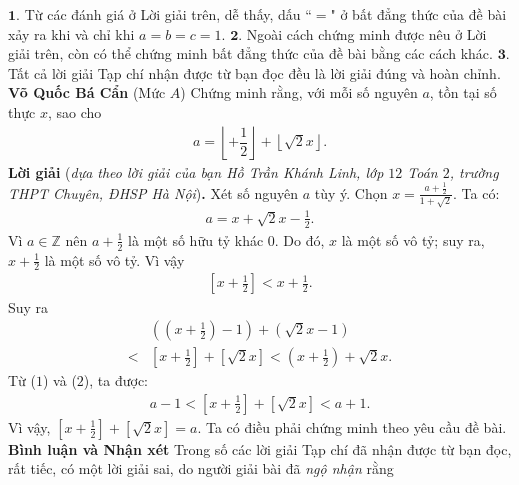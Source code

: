 \begin{multicols}{2}
	\vskip 0.05cm
	$\pmb{1.}$ Từ các đánh giá ở Lời giải trên, dễ thấy, dấu ``$=$" ở bất đẳng thức của đề bài xảy ra khi và chỉ khi $a = b = c = 1$.
	\vskip 0.05cm
	$\pmb{2.}$ Ngoài cách chứng minh được nêu ở Lời giải trên, còn có thể chứng minh bất đẳng thức của đề bài bằng các cách khác.
	\vskip 0.05cm
	$\pmb{3.}$ Tất cả lời giải Tạp chí nhận được từ bạn đọc đều là lời giải đúng và hoàn chỉnh.
	\vskip 0.15cm
	\hfill	\textbf{\color{thachthuctoanhoc}Võ Quốc Bá Cẩn}
	\vskip 0.15cm
	{}
	(Mức $A$) Chứng minh rằng, với mỗi số nguyên $a$, tồn tại số thực $x$, sao cho  
	\begin{align*}
		a=\left\lfloor +\dfrac12\right\rfloor+\left\lfloor\sqrt{2}x\right\rfloor.
	\end{align*}
	\textbf{\color{thachthuctoanhoc}Lời giải} (\textit{dựa theo lời giải của bạn Hồ Trần Khánh Linh, lớp $12$ Toán $2$, trường THPT Chuyên, ĐHSP Hà Nội})\textbf{\color{thachthuctoanhoc}.}
	\vskip 0.05cm
	Xét số nguyên $a$ tùy ý. Chọn $x = \frac{{a + \frac{1}{2}}}{{1 + \sqrt 2 }}.$  Ta có:
	\begin{align*}
		a = x + \sqrt 2 x - \frac{1}{2}. \tag{$1$}
	\end{align*}
	Vì $a \in \mathbb{Z}$  nên $a + \frac{1}{2}$ là một số hữu tỷ khác $0$. Do đó, $x$ là một số vô tỷ; suy ra, $x + \frac{1}{2}$ là một số vô tỷ. Vì vậy
	\begin{align*}
		\left[ {x + \frac{1}{2}} \right] < x + \frac{1}{2}.
	\end{align*}
	Suy ra
	\begin{align*}
		&\left( {\left( {x + \frac{1}{2}} \right) - 1} \right) + \left( {\sqrt 2 x - 1} \right) \\
		< &\left[ {x \!+\! \frac{1}{2}} \right] \!+\! \left[ {\sqrt 2 x} \right] \!<\! \left( {x \!+\! \frac{1}{2}} \right) \!+\! \sqrt 2 x. \tag{$2$}
	\end{align*}
	Từ ($1$) và ($2$), ta được:
	\begin{align*}
		a - 1 < \left[ {x + \frac{1}{2}} \right] + \left[ {\sqrt 2 x} \right] < a + 1.
	\end{align*}
	Vì vậy, $\left[ {x + \frac{1}{2}} \right] + \left[ {\sqrt 2 x} \right] = a$.
	\vskip 0.05cm   
	Ta có điều phải chứng minh theo yêu cầu đề bài.
	\vskip 0.05cm
	\textbf{\color{thachthuctoanhoc}Bình luận và Nhận xét}
	\vskip 0.05cm
	Trong số các lời giải Tạp chí đã nhận được từ bạn đọc, rất tiếc, có một lời giải sai, do người giải bài đã \textit{ngộ nhận} rằng
	\begin{align*}

\end{align*}
\end{multicols}
